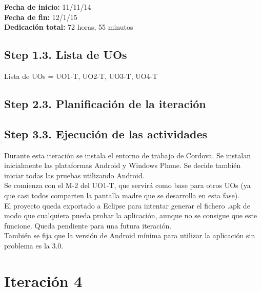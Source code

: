 \begin{flushleft}
\textbf{Fecha de inicio:} 11/11/14\\
\textbf{Fecha de fin:} 12/1/15\\
\textbf{Dedicación total:} 72 horas, 55 minutos\\
\end{flushleft}

\subsection{Step 1.3. Lista de UOs}
\label{it3:1.3}

Lista de UOs = {UO1-T, UO2-T, UO3-T, UO4-T}

\subsection{Step 2.3. Planificación de la iteración}
\label{it2:2.3}

\subsection{Step 3.3. Ejecución de las actividades}
\label{it2:3.3}

Durante esta iteración se instala el entorno de trabajo de Cordova. Se instalan inicialmente las plataformas Android y Windows Phone. Se decide también iniciar todas las pruebas utilizando Android.\\

Se comienza con el M-2 del UO1-T, que servirá como base para otros UOs (ya que casi todos comparten la pantalla madre que se desarrolla en esta fase).\\

El proyecto queda exportado a Eclipse para intentar generar el fichero .apk de modo que cualquiera pueda probar la aplicación, aunque no se consigue que este funcione. Queda pendiente para una futura iteración.\\

También se fija que la versión de Android mínima para utilizar la aplicación sin problema es la 3.0.\\


\section{Iteración 4}
\label{it4}

